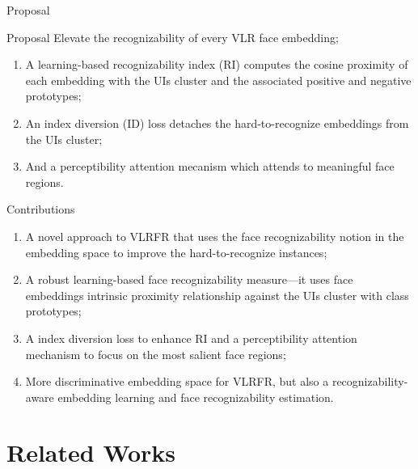 \documentclass[aspectratio=169,xcolor=dvipsnames]{beamer}
\begin{document}
\begin{frame}{Proposal}

    \begin{alertblock}{Proposal}
        Elevate the recognizability of every VLR face embedding;
    \end{alertblock}
    \begin{enumerate}
        \item A learning-based recognizability index (RI) computes the cosine proximity of each embedding with the UIs cluster and the associated positive and negative prototypes;
        \item An index diversion (ID) loss detaches the hard-to-recognize embeddings from the UIs cluster;
        \item And a perceptibility attention mecanism which attends to meaningful face regions.
    \end{enumerate}
\end{frame}
\begin{frame}{Contributions}
    \begin{enumerate}
        \item A novel approach to VLRFR that uses the face recognizability notion in the embedding space to improve the hard-to-recognize instances;
        \item A robust learning-based face recognizability measure---it uses face embeddings intrinsic proximity relationship against the UIs cluster with class prototypes;
        \item A index diversion loss to enhance RI and a perceptibility attention mechanism to focus on the most salient face regions;
        \item More discriminative embedding space for VLRFR, but also a recognizability-aware embedding learning and face recognizability estimation.
    \end{enumerate}    
\end{frame}
\section{Related Works}
\end{document}
